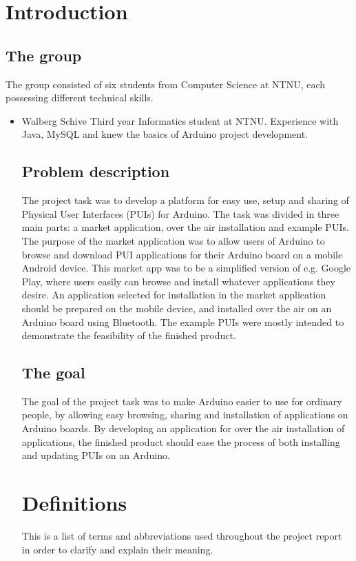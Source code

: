\section{Introduction}
\subsection{The group}
The group consisted of six students from Computer Science at NTNU, each possessing different technical skills.

\begin{itemize}
\item{\Wilhelm Walberg Schive}\newline %
	Third year Informatics student at NTNU. Experience with Java, MySQL and knew the basics of Arduino project development.


\subsection{Problem description}
The project task was to develop a platform for easy use, setup and sharing of Physical User Interfaces (PUIs) for Arduino. The task was divided in three main parts: a market application, over the air installation and example PUIs.\\
\newline
The purpose of the market application was to allow users of Arduino to browse and download PUI applications for their Arduino board on a mobile Android device. This market app was to be a simplified version of e.g. Google Play, where users easily can browse and install whatever applications they desire. An application selected for installation in the market application should be prepared on the mobile device, and installed over the air on an Arduino board using Bluetooth. The example PUIs were mostly intended to demonstrate the feasibility of the finished product.

\subsection{The goal}
The goal of the project task was to make Arduino easier to use for ordinary people, by allowing easy browsing, sharing and installation of applications on Arduino boards. By developing an application for over the air installation of applications, the finished product should ease the process of both installing and updating PUIs on an Arduino.

\section{Definitions}
This is a list of terms and abbreviations used throughout the project report in order to clarify and explain their meaning.


\end{itemize}
